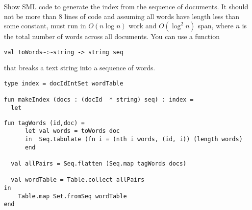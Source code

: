\begin{problem}%

\ask
Show SML code to generate the index from the sequence of documents.
It should not be more than 8 lines of code and assuming all words have
length less than some constant, must run in $O(n \log n)$ work and
$O(\log^2 n)$ span, where $n$ is the total number of words across all
documents.    You can use a function
\begin{lstlisting}
val toWords~:~string -> string seq
\end{lstlisting}
that breaks a text string into a sequence of words.

\begin{lstlisting}[numbers=none]
type index = docIdIntSet wordTable

fun makeIndex (docs : (docId  * string) seq) : index =
  let
\end{lstlisting}

\sol

\begin{lstlisting}[numbers=none]
  fun tagWords (id,doc) = 
      let val words = toWords doc
      in  Seq.tabulate (fn i = (nth i words, (id, i)) (length words) 
      end

  val allPairs = Seq.flatten (Seq.map tagWords docs)

  val wordTable = Table.collect allPairs
in
    Table.map Set.fromSeq wordTable
end
\end{lstlisting}
\end{problem}

